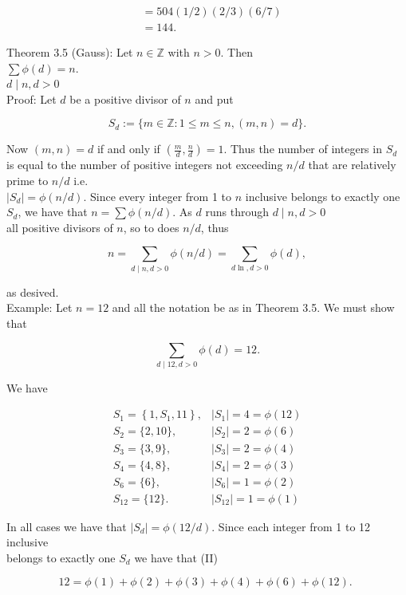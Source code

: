 \documentclass[10pt]{article}
\begin{document}
$$
\begin{aligned}
& =504(1 / 2)(2 / 3)(6 / 7) \\
& =144 .
\end{aligned}
$$

Theorem 3.5 (Gauss): Let $n \in \mathbb{Z}$ with $n>0$. Then\\
$\sum \phi(d)=n$.\\
$d \mid n, d>0$\\
Proof: Let $d$ be a positive divisor of $n$ and put

$$
S_{d}:=\{m \in \mathbb{Z}: 1 \leq m \leq n,(m, n)=d\} .
$$

Now $(m, n)=d$ if and only if $\left(\frac{m}{d}, \frac{n}{d}\right)=1$. Thus the number of integers in $S_{d}$ is equal to the number of positive integers not exceeding $n / d$ that are relatively prime to $n / d$ i.e.\\
$\left|S_{d}\right|=\phi(n / d)$. Since every integer from 1 to $n$ inclusive belongs to exactly one $S_{d}$, we have that $n=\sum \phi(n / d)$. As $d$ runs through $d \mid n, d>0$\\
all positive divisors of $n$, so to does $n / d$, thus

$$
n=\sum_{d \mid n, d>0} \phi(n / d)=\sum_{d \ln , d>0} \phi(d),
$$

as desived.\\
Example: Let $n=12$ and all the notation be as in Theorem 3.5. We must show that

$$
\sum_{d \mid 12, d>0} \phi(d)=12 .
$$

We have

$$
\begin{array}{ll}
S_{1}=\left\{1, S_{1}, 11\right\}, & \left|S_{1}\right|=4=\phi(12) \\
S_{2}=\{2,10\}, & \left|S_{2}\right|=2=\phi(6) \\
S_{3}=\{3,9\}, & \left|S_{3}\right|=2=\phi(4) \\
S_{4}=\{4,8\}, & \left|S_{4}\right|=2=\phi(3) \\
S_{6}=\{6\}, & \left|S_{6}\right|=1=\phi(2) \\
S_{12}=\{12\} . & \left|S_{12}\right|=1=\phi(1)
\end{array}
$$

In all cases we have that $\left|S_{d}\right|=\phi(12 / d)$. Since each integer from 1 to 12 inclusive\\
belongs to exactly one $S_{d}$ we have that (II)

$$
12=\phi(1)+\phi(2)+\phi(3)+\phi(4)+\phi(6)+\phi(12) \text {. }
$$
\end{document}
